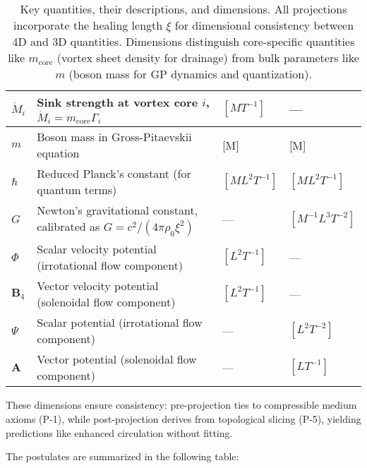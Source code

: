 \begin{table}[H]
\begin{tabularx}{\textwidth}{|l|Y|l|l|}
\hline
$\dot{M}_i$ & Sink strength at vortex core $i$, $\dot{M}_i = m_{\text{core}} \Gamma_i$ & $[M T^{-1}]$ & --- \\
\hline
$m$ & Boson mass in Gross-Pitaevskii equation & [M] & [M] \\
\hline
$\hbar$ & Reduced Planck's constant (for quantum terms) & $[M L^2 T^{-1}]$ & $[M L^2 T^{-1}]$ \\
\hline
$G$ & Newton's gravitational constant, calibrated as $G = c^2 / (4\pi \rho_0 \xi^2)$ & --- & $[M^{-1} L^3 T^{-2}]$ \\
\hline
$\Phi$ & Scalar velocity potential (irrotational flow component) & $[L^2 T^{-1}]$ & --- \\
\hline
$\mathbf{B}_4$ & Vector velocity potential (solenoidal flow component) & $[L^2 T^{-1}]$ & --- \\
\hline
$\Psi$ & Scalar potential (irrotational flow component) & --- & $[L^2 T^{-2}]$ \\
\hline
$\mathbf{A}$ & Vector potential (solenoidal flow component) & --- & $[L T^{-1}]$ \\
\hline
\end{tabularx}
\caption{Key quantities, their descriptions, and dimensions. All projections incorporate the healing length $\xi$ for dimensional consistency between 4D and 3D quantities. Dimensions distinguish core-specific quantities like $m_{\text{core}}$ (vortex sheet density for drainage) from bulk parameters like $m$ (boson mass for GP dynamics and quantization).\protect\footnotemark}
\label{tab:notation}
\end{table}

These dimensions ensure consistency: pre-projection ties to compressible medium axioms (P-1), while post-projection derives from topological slicing (P-5), yielding predictions like enhanced circulation without fitting.

The postulates are summarized in the following table:

